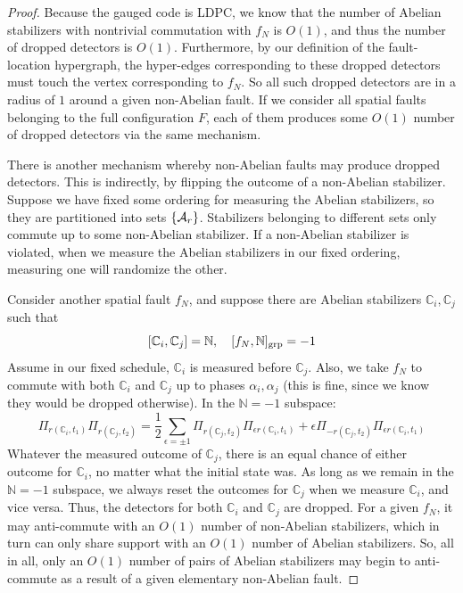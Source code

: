 \documentclass[11pt]{article}
\begin{document}
\begin{proof}
Because the gauged code is LDPC, we know that the number of Abelian stabilizers with nontrivial commutation with $f_N$ is $O(1)$, and thus the number of dropped detectors is $O(1)$. Furthermore, by our definition of the fault-location hypergraph, the hyper-edges corresponding to these dropped detectors must touch the vertex corresponding to $f_N$. So all such dropped detectors are in a radius of $1$ around a given non-Abelian fault. If we consider all spatial faults belonging to the full configuration $F$, each of them produces some $O(1)$ number of dropped detectors via the same mechanism. 

There is another mechanism whereby non-Abelian faults may produce dropped detectors. This is indirectly, by flipping the outcome of a non-Abelian stabilizer. Suppose we have fixed some ordering for measuring the Abelian stabilizers, so they are partitioned into sets $\{\mathcal{A}_r\}$. Stabilizers belonging to different sets only commute up to some non-Abelian stabilizer. If a non-Abelian stabilizer is violated, when we measure the Abelian stabilizers in our fixed ordering, measuring one will randomize the other. 

Consider another spatial fault $f_N$, and suppose there are Abelian stabilizers $\mathbb{C}_i, \mathbb{C}_j$ such that
\[
[\mathbb{C}_i, \mathbb{C}_j] = \mathbb{N}, \quad [ f_N, \mathbb{N} ]_{\text{grp}} = -1
\]
Assume in our fixed schedule, $\mathbb{C}_i$ is measured before $\mathbb{C}_j$. Also, we take $f_N$ to commute with both $\mathbb{C}_i$ and $\mathbb{C}_j$ up to phases $\alpha_i, \alpha_j$ (this is fine, since we know they would be dropped otherwise). In the $\mathbb{N}= -1$ subspace:
\[
\Pi_{r(\mathbb{C}_i, t_1)}\Pi_{r(\mathbb{C}_j, t_2)} = 
    \frac{1}{2} \sum_{\epsilon = \pm 1} \Pi_{r(\mathbb{C}_j, t_2)} \Pi_{\epsilon r(\mathbb{C}_i, t_1)} + \epsilon \Pi_{-r(\mathbb{C}_j, t_2)} \Pi_{\epsilon r(\mathbb{C}_i, t_1)}
\]
Whatever the measured outcome of $\mathbb{C}_j$, there is an equal chance of either outcome for $\mathbb{C}_i$, no matter what the initial state was. As long as we remain in the $\mathbb{N} = -1$ subspace, we always reset the outcomes for $\mathbb{C}_j$ when we measure $\mathbb{C}_i$, and vice versa. Thus, the detectors for both $\mathbb{C}_i$ and $\mathbb{C}_j$ are dropped. For a given $f_N$, it may anti-commute with an $O(1)$ number of non-Abelian stabilizers, which in turn can only share support with an $O(1)$ number of Abelian stabilizers. So, all in all, only an $O(1)$ number of pairs of Abelian stabilizers may begin to anti-commute as a result of a given elementary non-Abelian fault. 


\end{proof}
\end{document}
